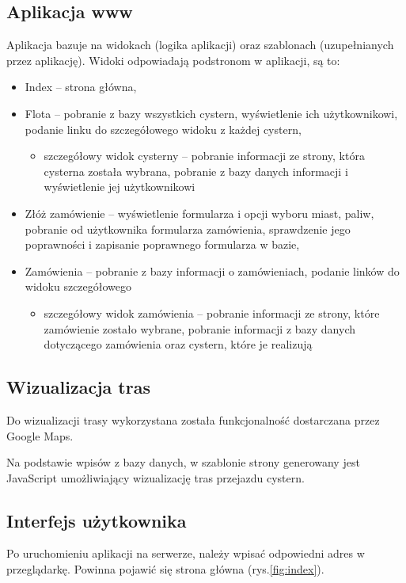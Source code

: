 \documentclass[11pt,a4paper,oneside]{mwart}
\begin{document}
\subsection{Aplikacja www}
Aplikacja bazuje na widokach (logika aplikacji) oraz szablonach (uzupełnianych przez aplikację). Widoki odpowiadają podstronom w aplikacji, są to:
\begin{itemize}
  \item Index -- strona główna,
  \item Flota -- pobranie z bazy wszystkich cystern, wyświetlenie ich użytkownikowi, podanie linku do szczegółowego widoku z każdej cystern,
    \begin{itemize}
      \item szczegółowy widok cysterny -- pobranie informacji ze strony, która cysterna została wybrana, pobranie z bazy danych informacji i wyświetlenie jej użytkownikowi
    \end{itemize}
  \item Złóż zamówienie -- wyświetlenie formularza i opcji wyboru miast, paliw, pobranie od użytkownika formularza zamówienia, sprawdzenie jego poprawności i zapisanie poprawnego formularza w bazie,
  \item Zamówienia -- pobranie z bazy informacji o zamówieniach, podanie linków do widoku szczegółowego
    \begin{itemize}
      \item szczegółowy widok zamówienia -- pobranie informacji ze strony, które zamówienie zostało wybrane, pobranie informacji z bazy danych dotyczącego zamówienia oraz cystern, które je realizują
    \end{itemize}
\end{itemize}

\subsection{Wizualizacja tras}

  Do wizualizacji trasy wykorzystana została funkcjonalność dostarczana przez Google Maps. 

  Na podstawie wpisów z bazy danych, w szablonie strony generowany jest JavaScript umożliwiający wizualizację tras przejazdu cystern.

\subsection{Interfejs użytkownika}
Po uruchomieniu aplikacji na serwerze, należy wpisać odpowiedni adres w przeglądarkę. Powinna pojawić się strona główna (rys.\ref{fig:index}).
\end{document}
